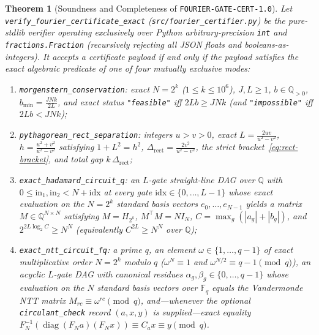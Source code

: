 \documentclass[11pt,a4paper]{article}
\newtheorem{theorem}{Theorem}[section]
\theoremstyle{definition}
\theoremstyle{remark}
\newcommand{\QQ}{\mathbb{Q}}
\newcommand{\FF}{\mathbb{F}}
\newcommand{\diag}{\operatorname{diag}}
\newcommand{\certschema}{\texttt{FOURIER-GATE-CERT-1.0}}
\begin{document}
\begin{theorem}[Soundness and Completeness of \certschema{}]\label{thm:verifier}
Let \texttt{verify\_fourier\_\allowbreak certificate\_exact} (\texttt{src/fourier\_certifier.py}) be the pure-stdlib verifier operating exclusively over Python arbitrary-precision \texttt{int} and \texttt{fractions.Fraction} (recursively rejecting all JSON floats and booleans-as-integers). It accepts a certificate payload if and only if the payload satisfies the exact algebraic predicate of one of four mutually exclusive modes:
\begin{enumerate}[leftmargin=1.8em,itemsep=2pt]
  \item \texttt{morgenstern\_conservation}: exact $N = 2^k$ ($1 \le k \le 10^6$), $J, L \ge 1$, $b \in \QQ_{>0}$, $b_{\min} = \frac{JNk}{2L}$, and exact status \texttt{"feasible"} iff $2 L b \ge J N k$ (and \texttt{"impossible"} iff $2 L b < J N k$);
  \item \texttt{pythagorean\_rect\_separation}: integers $u > v > 0$, exact $L = \frac{2uv}{u^2-v^2}$, $h = \frac{u^2+v^2}{u^2-v^2}$ satisfying $1 + L^2 = h^2$, $\Delta_{\mathrm{rect}} = \frac{2v^2}{u^2-v^2}$, the strict bracket~\eqref{eq:rect-bracket}, and total gap $k\,\Delta_{\mathrm{rect}}$;
  \item \texttt{exact\_hadamard\_circuit\_q}: an $L$-gate straight-line DAG over $\QQ$ with $0 \le \mathrm{in}_1, \mathrm{in}_2 < N + \mathrm{idx}$ at every gate $\mathrm{idx} \in \{0,\dots,L-1\}$ whose exact evaluation on the $N = 2^k$ standard basis vectors $e_0,\dots,e_{N-1}$ yields a matrix $M \in \QQ^{N\times N}$ satisfying $M = H_{2^k}$, $M^\top M = N I_N$, $C = \max_g(|a_g| + |b_g|)$, and $2^{2L \log_2 C} \ge N^N$ (equivalently $C^{2L} \ge N^N$ over $\QQ$);
  \item \texttt{exact\_ntt\_circuit\_fq}: a prime $q$, an element $\omega \in \{1,\dots,q-1\}$ of exact multiplicative order $N = 2^k$ modulo $q$ ($\omega^N \equiv 1$ and $\omega^{N/2} \equiv q-1 \pmod q$), an acyclic $L$-gate DAG with canonical residues $\alpha_g, \beta_g \in \{0,\dots,q-1\}$ whose evaluation on the $N$ standard basis vectors over $\FF_q$ equals the Vandermonde NTT matrix $M_{rc} \equiv \omega^{rc} \pmod q$, and---whenever the optional \texttt{circulant\_check} record $(a, x, y)$ is supplied---exact equality $F_N^{-1}(\diag(F_N a)(F_N x)) \equiv C_a x \equiv y \pmod q$.
\end{enumerate}
\end{theorem}
\end{document}
